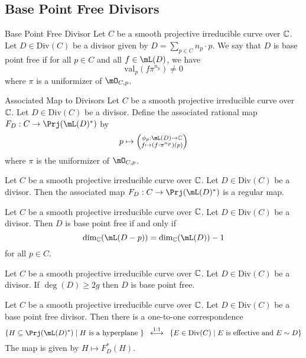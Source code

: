 \documentclass[a4paper]{article}
\begin{document}
\subsection{Base Point Free Divisors}
\begin{defn}{Base Point Free Divisor}{} Let $C$ be a smooth projective irreducible curve over $\mathbb{C}$. Let $D\in\text{Div}(C)$ be a divisor given by $D=\sum_{p\in C}n_p\cdot p$. We say that $D$ is base point free if for all $p\in C$ and all $f\in\mL(D)$, we have $$\text{val}_p(f\pi^{n_p})\neq 0$$ where $\pi$ is a uniformizer of $\mO_{C,p}$. 
\end{defn}

\begin{defn}{Associated Map to Divisors}{} Let $C$ be a smooth projective irreducible curve over $\mathbb{C}$. Let $D\in\text{Div}(C)$ be a divisor. Define the associated rational map $F_D:C\to\Prj(\mL(D)^\ast)$ by $$p\mapsto\left(\substack{\phi_p:\mL(D)\to\C\\f\mapsto(f\cdot\pi^{n_p})(p)}\right)$$ where $\pi$ is the uniformizer of $\mO_{C,p}$. 
\end{defn}

\begin{lmm}{}{} Let $C$ be a smooth projective irreducible curve over $\mathbb{C}$. Let $D\in\text{Div}(C)$ be a divisor. Then the associated map $F_D:C\to\Prj(\mL(D)^\ast)$ is a regular map. 
\end{lmm}

\begin{prp}{}{} Let $C$ be a smooth projective irreducible curve over $\mathbb{C}$. Let $D\in\text{Div}(C)$ be a divisor. Then $D$ is base point free if and only if $$\dim_\C(\mL(D-p))=\dim_\C(\mL(D))-1$$ for all $p\in C$. 
\end{prp}

\begin{crl}{}{} Let $C$ be a smooth projective irreducible curve over $\mathbb{C}$. Let $D\in\text{Div}(C)$ be a divisor. If $\deg(D)\geq 2g$ then $D$ is base point free. 
\end{crl}

\begin{prp}{}{} Let $C$ be a smooth projective irreducible curve over $\mathbb{C}$. Let $D\in\text{Div}(C)$ be a base point free divisor. Then there is a one-to-one correspondence $$\{H\subseteq\Prj(\mL(D)^\ast)\;|\;H\text{ is a hyperplane }\}\;\;\overset{1:1}{\longleftrightarrow}\;\;\{E\in\text{Div}(C)\;|\;E\text{ is effective and }E\sim D\}$$ The map is given by $H\mapsto F_D^\ast(H)$. 
\end{prp}
\end{document}
